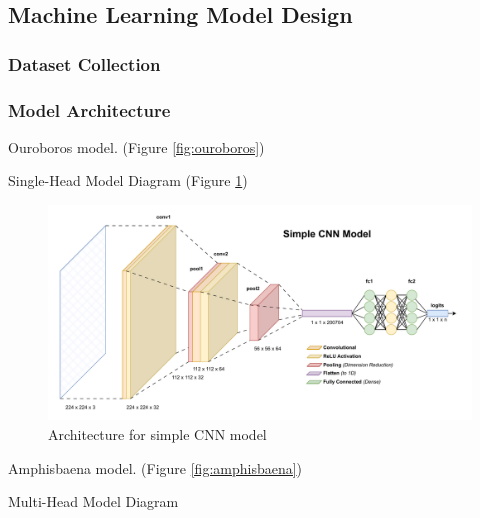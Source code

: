         \subsection{Machine Learning Model Design}
            \subsubsection{Dataset Collection}
        
            \subsubsection{Model Architecture}
    
                Ouroboros model. (Figure \ref{fig:ouroboros})
                
                \begin{temp}
                    Single-Head Model Diagram (Figure \ref{fig:BabyOuroboros})
                \end{temp}
    
                \begin{figure}[htbp]
                    \centering
                    \includegraphics[width=\linewidth]{images/BabyOuroboros.pdf}
                    \caption{Architecture for simple CNN model}
                    \label{fig:BabyOuroboros}
                \end{figure}
    
                Amphisbaena model. (Figure \ref{fig:amphisbaena})
    
                \begin{temp}
                    Multi-Head Model Diagram
                \end{temp}
    
